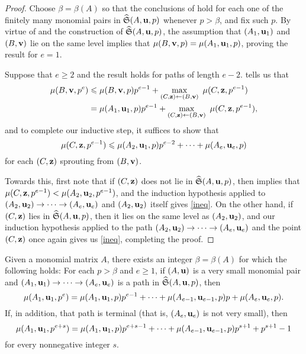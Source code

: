 \documentclass[11pt]{amsart}
\begin{document}
\begin{proof}
   Choose $\beta = \beta(A)$ so that the conclusions of   hold for each one of the finitely many monomial pairs in $\widehat{\mathfrak{S}}(A, \mathbf{u},p)$ whenever $p > \beta$, and fix such $p$.
    By virtue of  and the construction of $\widehat{\mathfrak{S}}(A,\mathbf{u},p)$, the assumption that $(A_1, \mathbf{u}_1)$ and $(B, \mathbf{v})$ lie on the same level implies that $\mu(B,\mathbf{v},p) = \mu(A_1, \mathbf{u}_1, p)$, proving the result for $e = 1$.

    Suppose that $e \geq 2$ and the result holds for paths of length $e-2$.
     tells us that
    \begin{align*}
      \mu(B,\mathbf{v},p^e) &\leqslant \mu(B,\mathbf{v},p) p^{e-1} + \max_{(C,\mathbf{z}) \leftarrow (B,\mathbf{v})} \ \mu(C,\mathbf{z},p^{e-1}) \\
      &= \mu(A_1,\mathbf{u}_1,p) p^{e-1} + \max_{(C,\mathbf{z}) \leftarrow (B,\mathbf{v})} \ \mu(C,\mathbf{z},p^{e-1}),
    \end{align*}
    and to complete our inductive step, it suffices to show that
    \begin{equation}\label{ineq}
        \mu(C,\mathbf{z},p^{e-1}) \leqslant \mu(A_2,\mathbf{u}_1,p) p^{e-2} + \cdots + \mu(A_e,\mathbf{u}_e,p)
    \end{equation}
    for each $(C,\mathbf{z})$ sprouting from $(B,\mathbf{v})$.

    Towards this, first note that if $(C, \mathbf{z})$ does not lie in $\widehat{\mathfrak{S}}(A,\mathbf{u},p)$, then  implies that $\mu(C, \mathbf{z},p^{e-1}) < \mu(A_2,\mathbf{u}_2, p^{e-1})$, and the induction hypothesis applied to $(A_2, \mathbf{u}_2) \to \cdots \to (A_e, \mathbf{u}_e)$ and $(A_2,\mathbf{u}_2)$ itself gives \eqref{ineq}.
    On the other hand, if $(C, \mathbf{z})$ lies in $\widehat{\mathfrak{S}}(A, \mathbf{u},p)$, then it lies on the same level as $(A_2, \mathbf{u}_2)$, and  our induction hypothesis applied to the path $(A_2, \mathbf{u}_2) \to \cdots \to (A_e, \mathbf{u}_e)$ and the point $(C, \mathbf{z})$ once again gives us \eqref{ineq}, completing the proof.
\end{proof}

\begin{theorem}\label{thm: formula for higher mu}
   Given a monomial matrix $A$, there exists an integer $\beta= \beta(A)$ for which the following holds\textup:
   For each $p>\beta$ and $e\ge 1$, if $(A, \mathbf{u})$ is a very small monomial pair and $(A_1, \mathbf{u}_1) \to \cdots \to (A_e, \mathbf{u}_e)$ is a path in $\widehat{\mathfrak{S}}(A, \mathbf{u}, p)$,  then
   \[
      \mu(A_1, \mathbf{u}_1, p^e) = \mu(A_1,\mathbf{u}_1,p)p^{e-1} + \cdots + \mu(A_{e-1},\mathbf{u}_{e-1},p)p + \mu(A_e,\mathbf{u}_e,p).
   \]
   If, in addition, that path is terminal \textup(that is, $(A_e,\mathbf{u}_e)$ is not very small\textup), then
      \[
 \mu(A_1, \mathbf{u}_1, p^{e+s}) = \mu(A_1, \mathbf{u}_1, p) p^{e+s-1} + \cdots + \mu(A_{e-1}, \mathbf{u}_{e-1}, p) p^{s+1} + p^{s+1} - 1
\]
for every nonnegative integer $s$.
\end{theorem}
\end{document}
